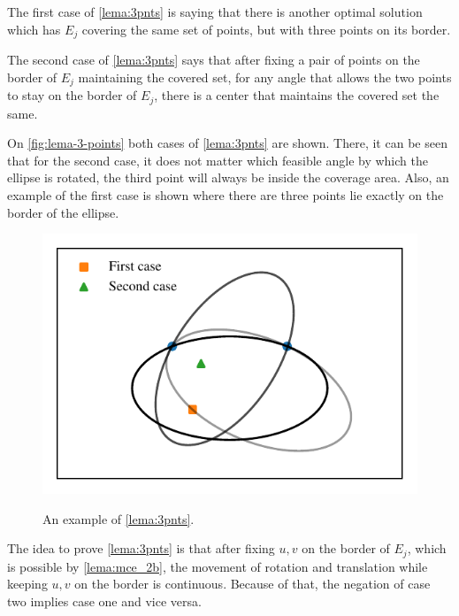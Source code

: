 The first case of \autoref{lema:3pnts} is saying that there is another optimal solution which has $E_j$ covering the same set of points, but with three points on its border. 

The second case of \autoref{lema:3pnts} says that after fixing a pair of points on the border of $E_j$ maintaining the covered set, for any angle that allows the two points to stay on the border of $E_j$, there is a center that maintains the covered set the same.

On \autoref{fig:lema-3-points} both cases of \autoref{lema:3pnts} are shown. There, it can be seen that for the second case, it does not matter which feasible angle by which the ellipse is rotated, the third point will always be inside the coverage area. Also, an example of the first case is shown where there are three points lie exactly on the border of the ellipse.

\begin{figure}
	\centering
	\caption{An example of \autoref{lema:3pnts}.}
	\includegraphics{tex/figures/scripts/lema-3-points}
	\fautor
	\label{fig:lema-3-points}
\end{figure}

The idea to prove \autoref{lema:3pnts} is that after fixing $u, v$ on the border of $E_j$, which is possible by \autoref{lema:mce_2b}, the movement of rotation and translation while keeping $u, v$ on the border is continuous. Because of that, the negation of case two implies case one and vice versa.


